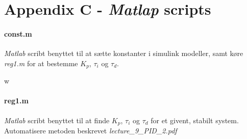 \section*{Appendix C - \emph{Matlap} scripts}
\paragraph{ const.m }
	\emph{Matlab} scribt benyttet til at sætte konstanter i simulink modeller, samt
	køre \emph{reg1.m} for at bestemme $K_p$, $\tau_i$ og $\tau_d$.

	w
\paragraph{ reg1.m }\label{app:reg1}
	\emph{Matlab} scribt benyttet til at finde $K_p$, $\tau_i$ og $\tau_d$ for et
	givent, stabilt system. Automatisere metoden beskrevet
	\emph{lecture\_9\_PID\_2.pdf}

